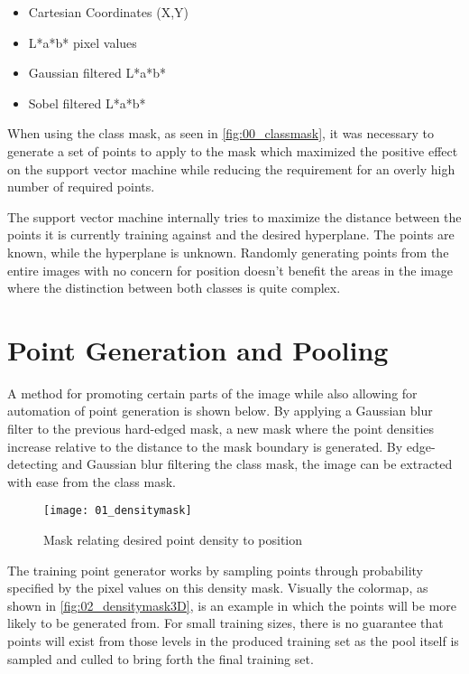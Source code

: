 \begin{itemize}
    \item Cartesian Coordinates (X,Y)
    \item L*a*b* pixel values
    \item Gaussian filtered L*a*b*
    \item Sobel filtered L*a*b*
\end{itemize}

When using the class mask, as seen in \ref{fig:00_classmask}, it was necessary to generate a set of points to apply to the mask which maximized the positive effect on the support vector machine while reducing the requirement for an overly high number of required points. 

The support vector machine internally tries to maximize the distance between the points it is currently training against and the desired hyperplane\citep{SH_hyperplane0}. The points are known, while the hyperplane is unknown. Randomly generating points from the entire images with no concern for position doesn't benefit the areas in the image where the distinction between both classes is quite complex. 

\section{Point Generation and Pooling}

A method for promoting certain parts of the image while also allowing for automation of point generation is shown below. By applying a Gaussian blur filter to the previous hard-edged mask, a new mask where the point densities increase relative to the distance to the mask boundary is generated. By edge-detecting and Gaussian blur filtering the class mask, the image can be extracted with ease from the class mask.

\begin{figure}[ht]
    \centering
    \texttt{[image: 01\_densitymask]}
    \caption{Mask relating desired point density to position}
    \label{fig:01_densitymask}
\end{figure}

The training point generator works by sampling points through probability specified by the pixel values on this density mask. Visually the colormap, as shown in \ref{fig:02_densitymask3D}, is an example in which the points will be more likely to be generated from. For small training sizes, there is no guarantee that points will exist from those levels in the produced training set as the pool itself is sampled and culled to bring forth the final training set.

